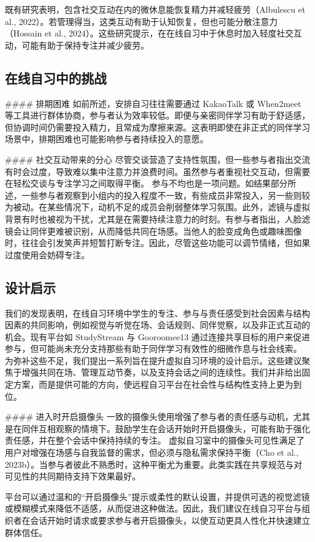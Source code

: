 \documentclass[12pt]{ctexart}
\begin{document}
既有研究表明，包含社交互动在内的微休息能恢复精力并减轻疲劳（Albulescu et al., 2022）。若管理得当，这类互动有助于认知恢复，但也可能分散注意力（Hossain et al., 2024）。这些研究提示，在在线自习中于休息时加入轻度社交互动，可能有助于保持专注并减少疲劳。

\subsection{在线自习中的挑战}
\#\#\#\# 排期困难
如前所述，安排自习往往需要通过 KakaoTalk 或 When2meet 等工具进行群体协商，参与者认为效率较低。即便与亲密同伴学习有助于舒适感，但协调时间仍需要投入精力，且常成为摩擦来源。这表明即使在非正式的同伴学习场景中，排期困难也可能影响参与者持续投入的意愿。

\#\#\#\# 社交互动带来的分心
尽管交谈营造了支持性氛围，但一些参与者指出交流有时会过度，导致难以集中注意力并浪费时间。虽然参与者重视社交互动，但需要在轻松交谈与专注学习之间取得平衡。
参与不均也是一项问题。如结果部分所述，一些参与者观察到小组内的投入程度不一致，有些成员非常投入，另一些则较为被动。在某些情况下，动机不足的成员会削弱整体学习氛围。此外，滤镜与虚拟背景有时也被视为干扰，尤其是在需要持续注意力的时刻。有参与者指出，人脸滤镜会让同伴更难被识别，从而降低共同在场感。当他人的脸变成角色或趣味图像时，往往会引发笑声并短暂打断专注。因此，尽管这些功能可以调节情绪，但如果过度使用会妨碍专注。

\subsection{设计启示}
我们的发现表明，在线自习环境中学生的专注、参与与责任感受到社会因素与结构因素的共同影响，例如视觉与听觉在场、会话规则、同伴觉察，以及非正式互动的机会。现有平台如 StudyStream 与 Gooroomee13 通过连接共享目标的用户来促进参与，但可能尚未充分支持那些有助于同伴学习有效性的细微作息与社会线索。
为弥补这些不足，我们提出一系列旨在提升虚拟自习环境的设计启示。这些建议聚焦于增强共同在场、管理互动节奏，以及支持会话之间的连续性。我们并非给出固定方案，而是提供可能的方向，使远程自习平台在社会性与结构性支持上更为到位。

\#\#\#\# 进入时开启摄像头
一致的摄像头使用增强了参与者的责任感与动机，尤其是在同伴互相观察的情境下。鼓励学生在会话开始时开启摄像头，可能有助于强化责任感，并在整个会话中保持持续的专注。
虚拟自习室中的摄像头可见性满足了用户对增强在场感与自我监督的需求，但必须与隐私需求保持平衡（Cho et al., 2023b）。当参与者彼此不熟悉时，这种平衡尤为重要。此类实践在共享规范与对可见性的共同期待支持下效果最好。

平台可以通过温和的“开启摄像头”提示或柔性的默认设置，并提供可选的视觉滤镜或模糊模式来降低不适感，从而促进这种做法。因此，我们建议在线自习平台与组织者在会话开始时请求或要求参与者开启摄像头，以使互动更具人性化并快速建立群体信任。
\end{document}
